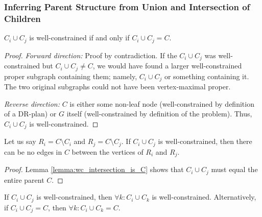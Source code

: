 
\subsubsection{Inferring Parent Structure from Union and Intersection of Children}
\label{sec:infer_parent}


\begin{lemma}\label{lemma:wc_intersection_is_C}
$C_i\cup C_j$ is well-constrained if and only if $C_i\cup C_j = C$.
\end{lemma}

\begin{proof}
\textit{Forward direction:} Proof by contradiction. If the $C_i\cup C_j$ was well-constrained but $C_i\cup C_j \neq C$, we would have found a larger well-constrained proper subgraph containing them; namely, $C_i\cup C_j$ or something containing it. The two original subgraphs could not have been vertex-maximal proper.

\textit{Reverse direction:} $C$ is either some non-leaf node (well-constrained by definition of a DR-plan) or $G$ itself (well-constrained by definition of the problem). Thus, $C_i\cup C_j$ is well-constrained.
\end{proof}

\begin{corollary}\label{corollary:no_edges_between_diff}
Let us say $R_i=C\setminus C_i$ and $R_j=C\setminus C_j$. If $C_i\cup C_j$ is well-constrained, then there can be no edges in $C$ between the vertices of $R_i$ and $R_j$.
\end{corollary}

\begin{proof}
Lemma \ref{lemma:wc_intersection_is_C} shows that $C_i\cup C_j$ must equal the entire parent $C$.
\end{proof}



\begin{lemma}\label{lemma:wc_intersection_makes_all_wc}
If $C_i\cup C_j$ is well-constrained, then $\forall k: C_i\cup C_k$ is well-constrained.
Alternatively, if $C_i\cup C_j=C$, then $\forall k: C_i\cup C_k=C$.
\end{lemma}

